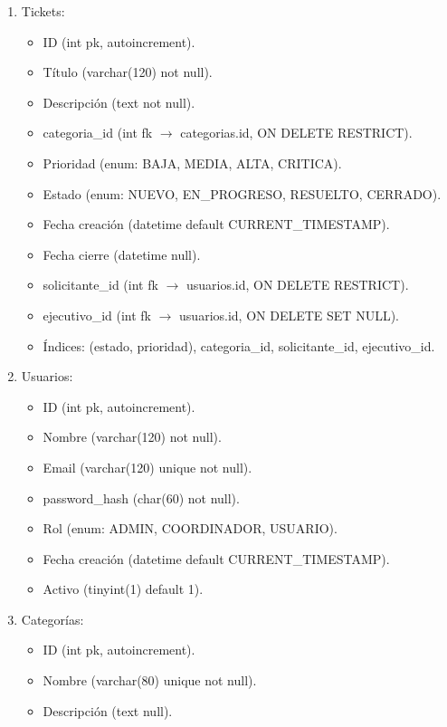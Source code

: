 \documentclass[letter,12pt]{article}
\begin{document}
\begin{enumerate}[leftmargin=*]
    \item Tickets:
    \begin{itemize}[leftmargin=1.5em,noitemsep,topsep=0pt]
        \item ID (int pk, autoincrement).
        \item Título (varchar(120) not null).
        \item Descripción (text not null).
        \item categoria\_id (int fk $\rightarrow$ categorias.id, ON DELETE RESTRICT).
        \item Prioridad (enum: BAJA, MEDIA, ALTA, CRITICA).
        \item Estado (enum: NUEVO, EN\_PROGRESO, RESUELTO, CERRADO).
        \item Fecha creación (datetime default CURRENT\_TIMESTAMP).
        \item Fecha cierre (datetime null).
        \item solicitante\_id (int fk $\rightarrow$ usuarios.id, ON DELETE RESTRICT).
        \item ejecutivo\_id (int fk $\rightarrow$ usuarios.id, ON DELETE SET NULL).
        \item Índices: (estado, prioridad), categoria\_id, solicitante\_id, ejecutivo\_id.
    \end{itemize}

    \item Usuarios:
    \begin{itemize}[leftmargin=1.5em,noitemsep,topsep=0pt]
        \item ID (int pk, autoincrement).
        \item Nombre (varchar(120) not null).
        \item Email (varchar(120) unique not null).
        \item password\_hash (char(60) not null).
        \item Rol (enum: ADMIN, COORDINADOR, USUARIO).
        \item Fecha creación (datetime default CURRENT\_TIMESTAMP).
        \item Activo (tinyint(1) default 1).
    \end{itemize}

    \item Categorías:
    \begin{itemize}[leftmargin=1.5em,noitemsep,topsep=0pt]
        \item ID (int pk, autoincrement).
        \item Nombre (varchar(80) unique not null).
        \item Descripción (text null).
    \end{itemize}


\end{enumerate}
\end{document}
